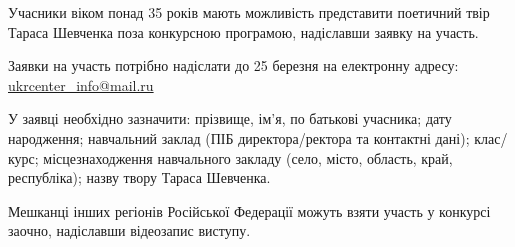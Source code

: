 Учасники віком понад 35 років мають можливість представити поетичний твір Тараса Шевченка поза конкурсною програмою, надіславши заявку на участь.

Заявки на участь потрібно надіслати до 25 березня на електронну адресу: \url{ukrcenter_info@mail.ru}

У заявці необхідно зазначити: прізвище, ім’я, по батькові учасника; дату
народження; навчальний заклад (ПІБ директора/ректора та контактні дані);
клас/курс; місцезнаходження навчального закладу (село, місто, область, край,
республіка); назву твору Тараса Шевченка.

Мешканці інших регіонів Російської Федерації можуть взяти участь у конкурсі заочно, надіславши відеозапис виступу.
